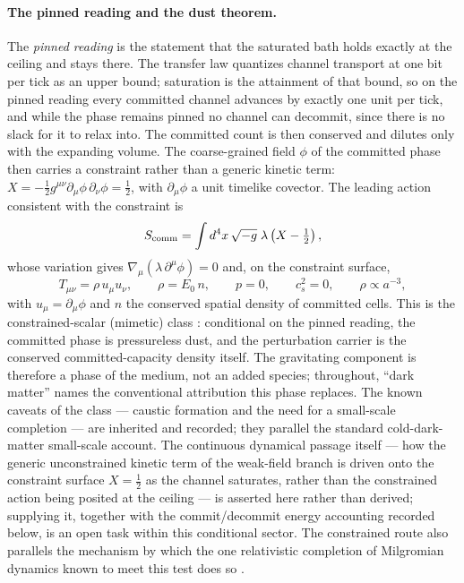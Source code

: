 \documentclass[11pt]{article}
\begin{document}
\paragraph{The pinned reading and the dust theorem.}
The \emph{pinned reading} is the statement that the saturated bath holds exactly at the ceiling and stays there. The transfer law quantizes channel transport at one bit per tick as an upper bound; saturation is the attainment of that bound, so on the pinned reading every committed channel advances by exactly one unit per tick, and while the phase remains pinned no channel can decommit, since there is no slack for it to relax into. The committed count is then conserved and dilutes only with the expanding volume. The coarse-grained field $\phi$ of the committed phase then carries a constraint rather than a generic kinetic term: $X=-\tfrac12 g^{\mu\nu}\partial_\mu\phi\,\partial_\nu\phi=\tfrac12$, with $\partial_\mu\phi$ a unit timelike covector. The leading action consistent with the constraint is
\[
S_{\rm comm}=\int d^4x\,\sqrt{-g}\;\lambda\left(X-\tfrac12\right),
\]
whose variation gives $\nabla_\mu(\lambda\,\partial^\mu\phi)=0$ and, on the constraint surface,
\[
T_{\mu\nu}=\rho\,u_\mu u_\nu,\qquad \rho=E_0\,n,\qquad p=0,\qquad c_s^2=0,\qquad \rho\propto a^{-3},
\]
with $u_\mu=\partial_\mu\phi$ and $n$ the conserved spatial density of committed cells. This is the constrained-scalar (mimetic) class \citep{ChamseddineMukhanov2013}: conditional on the pinned reading, the committed phase is pressureless dust, and the perturbation carrier is the conserved committed-capacity density itself. The gravitating component is therefore a phase of the medium, not an added species; throughout, ``dark matter'' names the conventional attribution this phase replaces. The known caveats of the class --- caustic formation and the need for a small-scale completion --- are inherited and recorded; they parallel the standard cold-dark-matter small-scale account. The continuous dynamical passage itself --- how the generic unconstrained kinetic term of the weak-field branch is driven onto the constraint surface $X=\tfrac12$ as the channel saturates, rather than the constrained action being posited at the ceiling --- is asserted here rather than derived; supplying it, together with the commit/decommit energy accounting recorded below, is an open task within this conditional sector. The constrained route also parallels the mechanism by which the one relativistic completion of Milgromian dynamics known to meet this test does so \citep{SkordisZlosnik2021}.
\end{document}

